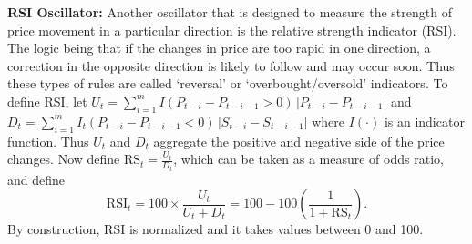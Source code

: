 \noindent\textbf{RSI Oscillator:} Another oscillator that is designed to measure the strength of price movement in a particular direction is the relative strength indicator (RSI). The logic being that if the changes in price are too rapid in one direction, a correction in the opposite direction is likely to follow and may occur soon. Thus these types of rules are called `reversal' or `overbought/oversold' indicators. To define RSI, let $U_{t} = \sum_{i=1}^m I(P_{t-i} - P_{t-i-1} > 0)\,\lvert P_{t-i} - P_{t-i-1} \rvert$ and $D_{t} = \sum_{i=1}^m I_{t} (P_{t-i} - P_{t-i-1} < 0)\,\lvert S_{t-i} - S_{t-i-1}\rvert$ where $I(\cdot)$ is an indicator function. Thus $U_t$ and $D_t$ aggregate the positive and negative side of the price changes. Now define $\text{RS}_{t} = \frac {U_{t}}{D_{t}}$, which can be taken as a measure of odds ratio, and define
	\begin{equation} \label{eqn:rsi}
	\text{RSI}_{t} = 100 \times \frac{U_{t}}{U_{t} + D_{t}} = 100 - 100 \left( \dfrac{1}{1 + \text{RS}_t} \right).
	\end{equation}
By construction, RSI is normalized and it takes values between 0 and 100. \twomedskip


\noindent{} \twomedskip


